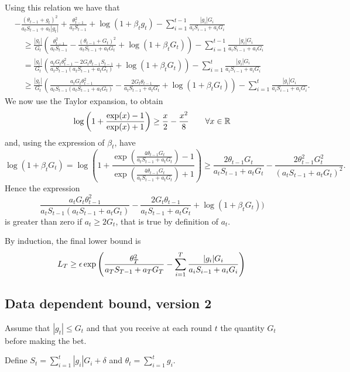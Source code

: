 Using this relation we have that
\begin{align}
&-\frac{(\theta_{t-1}+g_t)^2}{a_t S_{t-1}+a_t |g_t|} + \frac{\theta_{t-1}^2}{a_t S_{t-1}}+\log(1+\beta_t g_t)-\sum_{i=1}^{t-1} \frac{|g_i| G_i}{a_i S_{i-1} + a_i G_i} \\
&\quad \geq \frac{|g_t|}{G_t} (\frac{\theta_{t-1}^2}{a_t S_{t-1}} - \frac{(\theta_{t-1}+G_t)^2}{a_t S_{t-1} + a_t G_t} + \log(1+\beta_t G_t)) - \sum_{i=1}^{t-1} \frac{|g_i| G_i}{a_i S_{i-1} + a_i G_i}\\
&\quad = \frac{|g_t|}{G_t} (\frac{a_t G_t \theta_{t-1}^2 -2 G_t \theta_{t-1} S_{t-1} }{a_t S_{t-1}(a_t S_{t-1} + a_t G_t)} + \log(1+\beta_t G_t)) - \sum_{i=1}^{t} \frac{|g_i|G_i}{a_i S_{i-1} + a_i G_i}\\
&\quad \geq \frac{|g_t|}{G_t} (\frac{a_t G_t \theta_{t-1}^2}{a_t S_{t-1}(a_t S_{t-1} + a_t G_t)}-\frac{2 G_t \theta_{t-1}}{a_t S_{t-1} + a_t G_t} + \log(1+\beta_t G_t)) - \sum_{i=1}^{t} \frac{|g_i| G_i}{a_i S_{i-1} + a_i G_i}.
\end{align}
We now use the Taylor expansion, to obtain
\[
\log\left(1+\frac{\exp(x)-1}{\exp(x)+1}\right) \geq \frac{x}{2} -\frac{x^2}{8} \qquad \forall x \in \mathbb{R}
\]
and, using the expression of $\beta_t$, have
\[
\log\left(1+\beta_t G_t\right) = \log\left(1+\frac{\exp\left(\frac{4 \theta_{t-1} G_t}{a_t S_{t-1} + a_t G_t}\right)-1}{\exp\left(\frac{4 \theta_{t-1} G_t}{a_t S_{t-1} + a_t G_t}\right)+1}\right) \geq \frac{2 \theta_{t-1} G_t}{a_t S_{t-1} + a_t G_t} -\frac{2 \theta_{t-1}^2 G_t^2}{(a_t S_{t-1} + a_t G_t)^2}.
\]
Hence the expression 
\[
\frac{a_t G_t \theta_{t-1}^2}{a_t S_{t-1}(a_t S_{t-1} + a_t G_t)}-\frac{2 G_t \theta_{t-1}}{a_t S_{t-1} + a_t G_t} + \log(1+\beta_t G_t))
\]
is greater than zero if $a_t \geq 2 G_t$, that is true by definition of $a_t$.

By induction, the final lower bound is 
\[
L_{T} \geq \epsilon \exp\left(\frac{\theta_{T}^2}{a_T S_{T-1} + a_T G_T}-\sum_{i=1}^{T} \frac{|g_i| G_i}{a_i S_{i-1} + a_i G_i} \right) \\
\]

\subsection{Data dependent bound, version 2}

Assume that $|g_t|\leq G_t$ and that you receive at each round $t$ the quantity $G_t$ before making the bet.

Define $S_t = \sum_{i=1}^t |g_i| G_i + \delta$ and $\theta_t=\sum_{i=1}^t g_i$.

